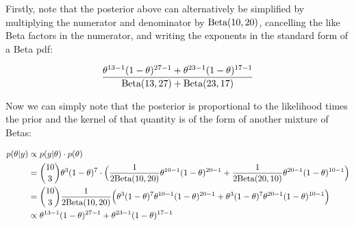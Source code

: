 
Firstly, note that the posterior above can alternatively be simplified by multiplying the numerator and denominator by $\text{Beta}(10, 20)$, cancelling the like Beta factors in the numerator, and writing the exponents in the standard form of a Beta pdf:

\begin{equation}
    \label{q3:target_eq}
    \frac{
            \theta^{13-1}(1-\theta)^{27-1} 
        +
             \theta^{23-1}(1-\theta)^{17-1} 
    }
    {
        \text{Beta}(13, 27)
        +
        \text{Beta}(23, 17)
    }
\end{equation}

Now we can simply note that the posterior is proportional to the likelihood times the prior and the kernel of that quantity is of the form of another mixture of Betas:

\begin{align*}
    p(\theta\vert y) &\propto p(y \vert \theta )\cdot p(\theta)\\
                     &={10 \choose 3}\theta^{3}(1-\theta)^{7}\cdot\Big(
                         \frac{1}{2\text{Beta}(10, 20)}\theta^{10-1}(1-\theta)^{20-1}
                 +
             \frac{1}{2\text{Beta}(20, 10)}\theta^{20-1}(1-\theta)^{10-1}\Big)\\
                     &={10 \choose 3}\frac{1}{2\text{Beta}(10, 20)}\Big(
                    \theta^{3}(1-\theta)^{7}\theta^{10-1}(1-\theta)^{20-1}
                 +
                    \theta^{3}(1-\theta)^{7}\theta^{20-1}(1-\theta)^{10-1}\Big)\\
                     &\propto
                    \theta^{13-1}(1-\theta)^{27-1}
                 +
                    \theta^{23-1}(1-\theta)^{17-1}\\
\end{align*}

